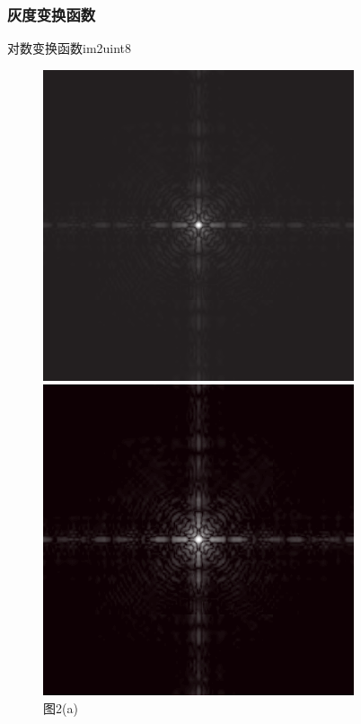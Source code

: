 \documentclass[notheorems,serif,table,compress]{beamer}  %
\begin{document}
\begin{frame}
\frametitle{灰度变换函数}
    
\begin{description}
 \item [对数变换函数im2uint8]
 \end{description}
    \begin{figure}
        \begin{minipage}[t]{0.4\linewidth}
        \centering
        \includegraphics[width=1\linewidth]{ma2_a.png} 
        \caption{图2(a)}
        \end{minipage}
        \begin{minipage}[t]{0.4\linewidth}
        \centering
        \includegraphics[width=1\linewidth]{ma2_b.png} 

\end{minipage}
\end{figure}
\end{frame}
\end{document}
